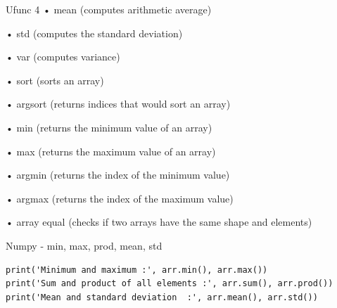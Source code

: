 \documentclass{beamer}
\begin{document}
\begin{frame}{Ufunc 4}
• mean (computes arithmetic average)

• std (computes the standard deviation)

• var (computes variance)

• sort (sorts an array)

• argsort (returns indices that would sort an array)

• min (returns the minimum value of an array)

• max (returns the maximum value of an array)

• argmin (returns the index of the minimum value)

• argmax (returns the index of the maximum value)

• array equal (checks if two arrays have the same shape and elements)
\end{frame}

\begin{frame}[fragile]{Numpy - min, max, prod, mean, std }

\begin{lstlisting}
print('Minimum and maximum :', arr.min(), arr.max())
print('Sum and product of all elements :', arr.sum(), arr.prod())
print('Mean and standard deviation  :', arr.mean(), arr.std())
\end{lstlisting}

\end{frame}


\end{document}
